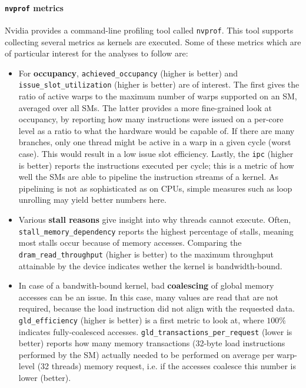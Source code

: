 \paragraph{\texttt{nvprof} metrics} \label{sec:metrics} Nvidia provides a command-line profiling tool called \texttt{nvprof}. This tool supports collecting several metrics as kernels are executed. Some of these metrics which are of particular interest for the analyses to follow are:

\begin{itemize}
	\item For \textbf{occupancy}, \texttt{achieved\_occupancy} (higher is better) and \texttt{issue\_slot\_utilization} (higher is better) are of interest. The first gives the ratio of active warps to the maximum number of warps supported on an SM, averaged over all SMs. The latter provides a more fine-grained look at occupancy, by reporting how many instructions were issued on a per-core level as a ratio to what the hardware would be capable of. If there are many branches, only one thread might be active in a warp in a given cycle (worst case). This would result in a low issue slot efficiency. Lastly, the \texttt{ipc} (higher is better) reports the instructions executed per cycle; this is a metric of how well the SMs are able to pipeline the instruction streams of a kernel. As pipelining is not as sophisticated as on CPUs, simple measures such as loop unrolling may yield better numbers here.
	\item Various \textbf{stall reasons} give insight into why threads cannot execute. Often, \texttt{stall\_memory\_dependency} reports the highest percentage of stalls, meaning most stalls occur because of memory accesses. Comparing the \texttt{dram\_read\_throughput} (higher is better) to the maximum throughput attainable by the device indicates wether the kernel is bandwidth-bound.
	\item In case of a bandwith-bound kernel, bad \textbf{coalescing} of global memory accesses can be an issue. In this case, many values are read that are not required, because the load instruction did not align with the requested data. \texttt{gld\_efficiency} (higher is better) is a first metric to look at, where $100\%$ indicates fully-coalesced accesses. \texttt{gld\_transactions\_per\_request} (lower is better) reports how many memory transactions (32-byte load instructions performed by the SM) actually needed to be performed on average per warp-level (32 threads) memory request, i.e. if the accesses coalesce this number is lower (better).

\end{itemize}
